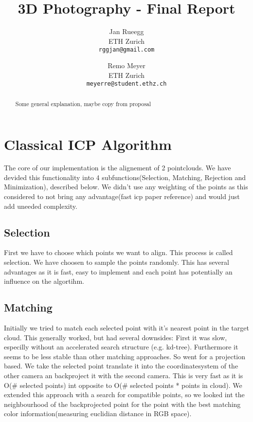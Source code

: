\documentclass[10pt,twocolumn,letterpaper]{article}
\begin{document}
\title{3D Photography - Final Report}

\author{Jan Rueegg\\
ETH Zurich\\
{\tt\small rggjan@gmail.com}
\and
Remo Meyer\\
ETH Zurich\\
{\tt\small meyerre@student.ethz.ch}
}

\maketitle
\thispagestyle{empty}

\begin{abstract}
Some general explanation, maybe copy from proposal
\end{abstract}

\section{Classical ICP Algorithm}
\cite{fasticp}

The core of our implementation is the alignement of 2 pointclouds. 
We have devided this functionality into 4 subfunctions(Selection, Matching, Rejection and Minimization), described below. 
We didn't use any weighting of the points as this considered to not bring any advantage(fast icp paper reference) and would just add uneeded complexity.

\subsection{Selection}
First we have to choose which points we want to align. This process is called selection. 
We have choosen to sample the points randomly. 
This has several advantages as it is fast, easy to implement and each point has potentially an influence on the algortihm.

\subsection{Matching}
Initially we tried to match each selected point with it's nearest point in the target cloud. 
This generally worked, but had several downsides: First it was slow, especilly without an accelerated search structure (e.g. kd-tree). 
Furthermore it seems to be less stable than other matching approaches. 
So went for a projection based. We take the selected point translate it into the coordinatesystem of the other camera an backproject it with the second camera.
This is very fast as it is O(\# selected points) int opposite to O(\# selected points * points in cloud). 
We extended this approach with a search for compatible points, so we looked int the neighbourhood of the backprojected point for the point with the best matching color information(measuring euclidian distance in RGB space).
\end{document}

